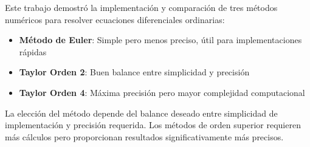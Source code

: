 \documentclass[12pt,a4paper]{article}
\begin{document}
Este trabajo demostró la implementación y comparación de tres métodos numéricos para resolver ecuaciones diferenciales ordinarias:

\begin{itemize}
    \item \textbf{Método de Euler}: Simple pero menos preciso, útil para implementaciones rápidas
    \item \textbf{Taylor Orden 2}: Buen balance entre simplicidad y precisión
    \item \textbf{Taylor Orden 4}: Máxima precisión pero mayor complejidad computacional
\end{itemize}

La elección del método depende del balance deseado entre simplicidad de implementación y precisión requerida. Los métodos de orden superior requieren más cálculos pero proporcionan resultados significativamente más precisos.
\end{document}
